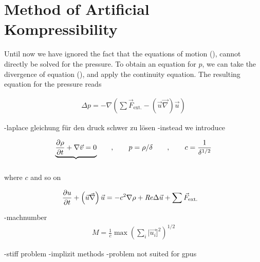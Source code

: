 \section{Method of Artificial Kompressibility}

Until now we have ignored the fact that the equations of motion (), cannot directly be solved for the pressure.
To obtain an equation for $p$, we can take the divergence of equation (), and apply the continuity equation.
The resulting equation for the pressure reads

\begin{align}
    \Delta p =  -\nabla \left( \sum \vec{F}_{\text{ext.}} - (\vec{u} \vec{\nabla}) \vec{u}\right)
\end{align}

-laplace gleichung für den druck schwer zu lösen
-instead we introduce

\begin{align}
    \underbrace{\pdn[\rho]{t} +  \nabla \vec{v} = 0}_{\label{bla}} \qquad , \qquad p =\rho/\delta \qquad, \qquad c=\frac{1}{\delta^{1/2}}
\end{align}

where $c$ and so on

\begin{align}
    \label{numerik:nsac}
    \pdn[u]{t} + \left(\vec{u} \vec{\nabla}\right) \vec{u} &= -c^2\nabla\rho + \Rey \Delta \vec{u}+\sum \vec{F}_{\text{ext.}}
\end{align}

-machnumber
\begin{align}
    M = \frac{1}{c}\max\left(\sum_i |\vec{u_i}]^2\right)^{1/2}
\end{align}



-stiff problem
-implizit methods
-problem not suited for gpus


